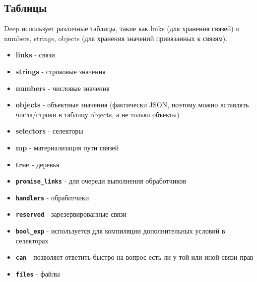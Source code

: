 \subsection{Таблицы}
Deep использует различные таблицы, такие как links (для хранения связей) и
numbers, strings, objects (для хранения значений привязанных к связям).

\begin{itemize}
      \item \textbf{links} - связи
      \item \textbf{strings} - строковые значения
      \item \textbf{numbers} - числовые значения
      \item \textbf{objects} - объектные значения (фактически JSON, поэтому
            можно
            вставлять числа/строки в таблицу objects, а не только объекты)
      \item \textbf{selectors} - селекторы
      \item \textbf{mp} - материализация пути связей
      \item \textbf{tree} - деревья
      \item \textbf{\texttt{promise\_links}} - для очереди выполнения
            обработчиков
      \item \textbf{\texttt{handlers}} - обработчики
      \item \textbf{\texttt{reserved}} - зарезервированные связи
      \item \textbf{\texttt{bool\_exp}} - используется для компиляции
            дополнительных условий в селекторах
      \item \textbf{\texttt{can}} - позволяет ответить быстро на вопрос есть ли
            у
            той или иной связи прав
      \item \textbf{\texttt{files}} - файлы
\end{itemize}


